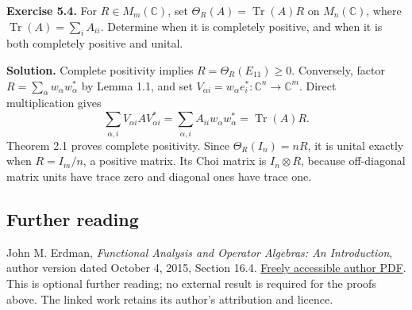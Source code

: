 \documentclass[
  11pt,
]{article}
\begin{document}
\textbf{Exercise 5.4.} For \(R\in M_m(\mathbb C)\), set
\(\Theta_R(A)=\operatorname{Tr}(A)R\) on \(M_n(\mathbb C)\), where
\(\operatorname{Tr}(A)=\sum_iA_{ii}\). Determine when it is completely
positive, and when it is both completely positive and unital.

\textbf{Solution.} Complete positivity implies
\(R=\Theta_R(E_{11})\geq0\). Conversely, factor
\(R=\sum_\alpha w_\alpha w_\alpha^*\) by Lemma 1.1, and set
\(V_{\alpha i}=w_\alpha e_i^*:\mathbb C^n\to\mathbb C^m\). Direct
multiplication gives \[
\sum_{\alpha,i}V_{\alpha i}A V_{\alpha i}^*
=\sum_{\alpha,i}A_{ii}w_\alpha w_\alpha^*
=\operatorname{Tr}(A)R.
\] Theorem 2.1 proves complete positivity. Since \(\Theta_R(I_n)=nR\),
it is unital exactly when \(R=I_m/n\), a positive matrix. Its Choi
matrix is \(I_n\otimes R\), because off-diagonal matrix units have trace
zero and diagonal ones have trace one.

\subsection{Further reading}\label{further-reading}

John M. Erdman, \emph{Functional Analysis and Operator Algebras: An
Introduction}, author version dated October 4, 2015, Section 16.4.
\href{https://web.pdx.edu/~erdman/FAOA/functional_analysis_operator_algebras_pdf.pdf}{Freely
accessible author PDF}. This is optional further reading; no external
result is required for the proofs above. The linked work retains its
author's attribution and licence.
\end{document}
